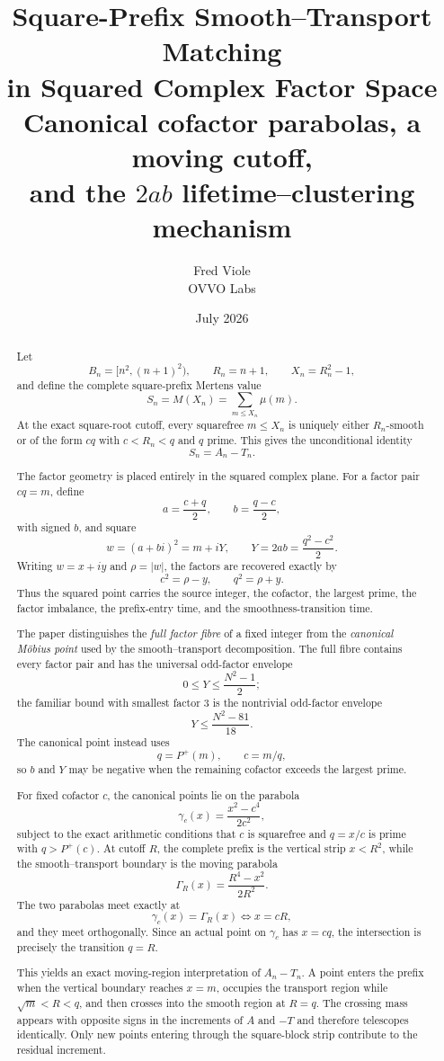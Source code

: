 \documentclass[11pt]{article}
\title{\textbf{Square-Prefix Smooth--Transport Matching\\
in Squared Complex Factor Space}\\[0.45em]
\large Canonical cofactor parabolas, a moving cutoff,\\
and the $2ab$ lifetime--clustering mechanism}
\author{Fred Viole\\OVVO Labs}
\date{July 2026}
\theoremstyle{definition}
\theoremstyle{remark}
\newcommand{\Pplus}{P^{+}}
\newcommand{\1}{\mathbf{1}}
\begin{document}
\maketitle

\begin{abstract}
Let
\[
 B_n=[n^2,(n+1)^2),\qquad
 R_n=n+1,\qquad
 X_n=R_n^2-1,
\]
and define the complete square-prefix Mertens value
\[
 S_n=M(X_n)=\sum_{m\le X_n}\mu(m).
\]
At the exact square-root cutoff, every squarefree $m\le X_n$ is uniquely either $R_n$-smooth or of the form $cq$ with $c<R_n<q$ and $q$ prime.  This gives the unconditional identity
\[
 S_n=A_n-T_n.
\]

The factor geometry is placed entirely in the squared complex plane.  For a factor pair $cq=m$, define
\[
 a=\frac{c+q}{2},\qquad b=\frac{q-c}{2},
\]
with signed $b$, and square
\[
 w=(a+bi)^2=m+iY,
 \qquad
 Y=2ab=\frac{q^2-c^2}{2}.
\]
Writing $w=x+iy$ and $\rho=|w|$, the factors are recovered exactly by
\[
 c^2=\rho-y,\qquad q^2=\rho+y.
\]
Thus the squared point carries the source integer, the cofactor, the largest prime, the factor imbalance, the prefix-entry time, and the smoothness-transition time.

The paper distinguishes the \emph{full factor fibre} of a fixed integer from the \emph{canonical M\"obius point} used by the smooth--transport decomposition.  The full fibre contains every factor pair and has the universal odd-factor envelope
\[
 0\le Y\le\frac{N^2-1}{2};
\]
the familiar bound with smallest factor $3$ is the nontrivial odd-factor envelope
\[
 Y\le\frac{N^2-81}{18}.
\]
The canonical point instead uses
\[
 q=\Pplus(m),\qquad c=m/q,
\]
so $b$ and $Y$ may be negative when the remaining cofactor exceeds the largest prime.

For fixed cofactor $c$, the canonical points lie on the parabola
\[
 \gamma_c(x)=\frac{x^2-c^4}{2c^2},
\]
subject to the exact arithmetic conditions that $c$ is squarefree and $q=x/c$ is prime with $q>\Pplus(c)$.  At cutoff $R$, the complete prefix is the vertical strip $x<R^2$, while the smooth--transport boundary is the moving parabola
\[
 \Gamma_R(x)=\frac{R^4-x^2}{2R^2}.
\]
The two parabolas meet exactly at
\[
 \gamma_c(x)=\Gamma_R(x)\iff x=cR,
\]
and they meet orthogonally.  Since an actual point on $\gamma_c$ has $x=cq$, the intersection is precisely the transition $q=R$.

This yields an exact moving-region interpretation of $A_n-T_n$.  A point enters the prefix when the vertical boundary reaches $x=m$, occupies the transport region while $\sqrt m<R<q$, and then crosses into the smooth region at $R=q$.  The crossing mass appears with opposite signs in the increments of $A$ and $-T$ and therefore telescopes identically.  Only new points entering through the square-block strip contribute to the residual increment.


\end{abstract}
\end{document}
